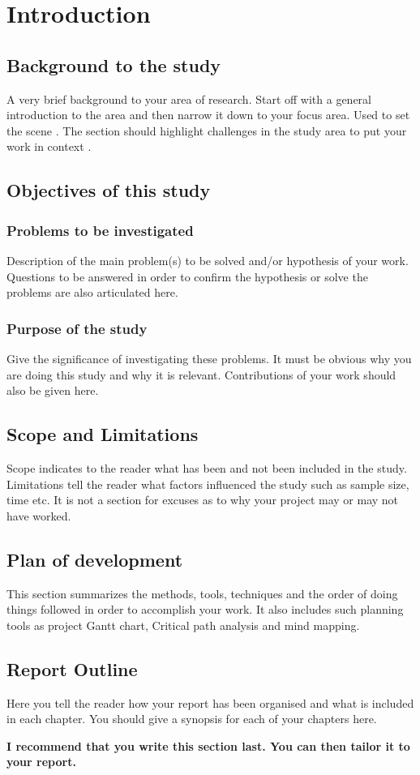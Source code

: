 \chapter{Introduction}

\section{Background to the study}
A very brief background to your area of research. Start off with a general introduction to the area and
then narrow it down to your focus area. Used to set the scene \cite{smt2011}. The section should highlight challenges in the study area to put your work in context \cite{kamen}.
\section{Objectives of this study}
\subsection{Problems to be investigated}
Description of the main problem(s) to be solved and/or hypothesis of your work. Questions to be answered in order to confirm the hypothesis or solve the problems are also articulated here.
\subsection{Purpose of the study}
Give the significance of investigating these problems. It must be obvious why you are doing this study
and why it is relevant. Contributions of your work should also be given here.

\section{Scope and Limitations}
Scope indicates to the reader what has been and not been included in the study. Limitations tell the
reader what factors influenced the study such as sample size, time etc. It is not a section for excuses as
to why your project may or may not have worked.

\section{Plan of development}
This section summarizes the methods, tools, techniques and the order of doing things followed in order to accomplish your work. It also includes such planning tools as project Gantt chart, Critical path analysis and mind mapping.

\section{Report Outline}
Here you tell the reader how your report has been organised and what is included in each
chapter. You should give a synopsis for each of your chapters here.

{\bf I recommend that you write this section last. You can then tailor it to your report.}
